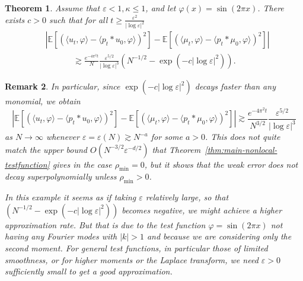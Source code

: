 \documentclass[a4paper,12pt]{article}
\newtheorem{theorem}{Theorem}[section]
\newtheorem{remark}[theorem]{Remark}
\newcommand{\E}{\mathbb{E}}
\begin{document}
\begin{theorem}
    Assume that $\varepsilon<1, \kappa \leq 1$, and let $\varphi(x) = \sin(2\pi x)$. 
    There exists $c>0$ such that for all $t \geq \frac{\varepsilon^2}{|\log \varepsilon|^2}$
    \begin{align} \nonumber
        & |\E[(\langle u_t,\varphi\rangle - \langle p_t \ast u_0, \varphi\rangle)^2] - \E[(\langle \mu_t, \varphi\rangle - \langle p_t \ast \mu_0, \varphi\rangle)^2]| \\
        &\hspace{40pt} \gtrsim \frac{e^{-4\pi^2 t}}{N}  \frac{\varepsilon^{5/2}}{|\log \varepsilon|^{3}} (N^{-1/2} - \exp(-c|\log\varepsilon|^2)).
    \end{align}
\end{theorem}
\begin{remark}
    In particular, since $\exp(-c|\log \varepsilon|^2)$ decays faster than any monomial, we obtain
\[
     |\E[(\langle u_t,\varphi\rangle - \langle p_t \ast u_0, \varphi\rangle)^2] - \E[(\langle \mu_t, \varphi\rangle - \langle p_t \ast \mu_0, \varphi\rangle)^2]| \gtrsim \frac{e^{-4\pi^2 t}}{N^{3/2}}  \frac{\varepsilon^{5/2}}{|\log \varepsilon|^{3}} 
\]
as $N\to \infty$ whenever $\varepsilon = \varepsilon(N) \gtrsim N^{-a}$ for some $a>0$. This does not quite match the upper bound $O(N^{-3/2} \varepsilon^{-d/2})$ that Theorem~\ref{thm:main-nonlocal-testfunction} gives in the case $\rho_{\min} = 0$, but it shows that the weak error does not decay superpolynomially unless $\rho_{\min}>0$.

In this example it seems as if taking $\varepsilon$ relatively large, so that $(N^{-1/2} - \exp(-c|\log\varepsilon|^2))$ becomes negative, we might achieve a higher approximation rate. But that is due to the test function $\varphi = \sin(2\pi x)$ not having any Fourier modes with $|k|> 1$ and because we are considering only the second moment. For general test functions, in particular those of limited smoothness, or for higher moments or the Laplace transform, we need $\varepsilon>0$ sufficiently small to get a good approximation.
\end{remark}
\end{document}
